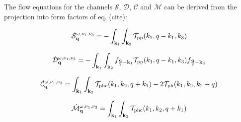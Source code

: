 The flow equations for the channels $\mathcal{S}$,  $\mathcal{D}$, $\mathcal{C}$ and $\mathcal{M}$ can be derived from the projection into form factors of eq. (cite):

\begin{equation}
\dot{\mathcal{S}}_{\mathbf{q}}^{\omega,\nu_1,\nu_3}  = - \int _{\mathbf{k}_1} \int_{\mathbf{k}_2} \mathcal{T}_{\mathrm{pp}}(k_1,q-k_1,k_3)
\end{equation}

\begin{equation}
\dot{\mathcal{D}}_{\mathbf{q}}^{\omega,\nu_1,\nu_3}  = -
\int _{\mathbf{k}_1} \int_{\mathbf{k}_2} f_{\frac{\mathbf{q}}{2} - \mathbf{k}_1} \mathcal{T}_{\mathrm{pp}}(k_1,q-k_1,k_3) f_{\frac{\mathbf{q}}{2} - \mathbf{k}_3}
\end{equation}

\begin{equation}
\dot{\mathcal{C}}_{\mathbf{q}}^{\omega,\nu_1,\nu_2}  = 
\int _{\mathbf{k}_1} \int_{\mathbf{k}_2}  \mathcal{T}_{\mathrm{phc}}(k_1,k_2,q+k_1) -2\mathcal{T}_{\mathrm{ph}}(k_1,k_2,k_2-q) 
\end{equation}

\begin{equation}
\dot{\mathcal{M}}_{\mathbf{q}}^{\omega,\nu_1,\nu_2}  = 
\int _{\mathbf{k}_1} \int_{\mathbf{k}_2}  \mathcal{T}_{\mathrm{phc}}(k_1,k_2,q+k_1)
\end{equation}

